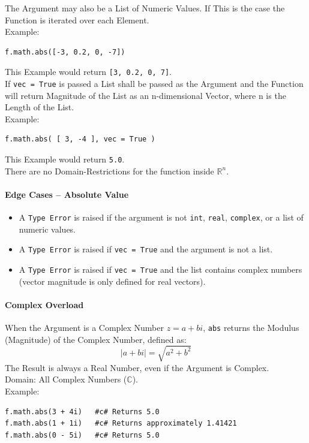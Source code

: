 The Argument may also be a List of Numeric Values. If This is the case the Function is iterated over each Element.\\
Example:
\begin{verbatim}
f.math.abs([-3, 0.2, 0, -7])
\end{verbatim}
This Example would return \texttt{[3, 0.2, 0, 7]}. \vspace{5 mm}\\
If \texttt{vec = True} is passed a List shall be passed as the Argument and the Function will return Magnitude of the List as an n-dimensional Vector, where n is the Length of the List.\\ %
Example:
\begin{verbatim}
f.math.abs( [ 3, -4 ], vec = True )
\end{verbatim}
This Example would return \texttt{5.0}.\\
There are no Domain-Restrictions for the function inside $\mathbb{R}^n$.

\paragraph{Edge Cases -- Absolute Value}
\begin{itemize}
\item A \texttt{Type Error} is raised if the argument is not \texttt{int}, \texttt{real}, \texttt{complex}, or a list of numeric values.
\item A \texttt{Type Error} is raised if \texttt{vec = True} and the argument is not a list.
\item A \texttt{Type Error} is raised if \texttt{vec = True} and the list contains complex numbers (vector magnitude is only defined for real vectors).
\end{itemize}

\paragraph{Complex Overload}
When the Argument is a Complex Number $z = a + bi$, \texttt{abs} returns the Modulus (Magnitude) of the Complex Number, defined as:
\[
\lvert a + bi \rvert = \sqrt{a^2 + b^2}
\]
The Result is always a Real Number, even if the Argument is Complex.\\
Domain: All Complex Numbers ($\mathbb{C}$).\\
Example:
\begin{verbatim}
f.math.abs(3 + 4i)   #c# Returns 5.0
f.math.abs(1 + 1i)   #c# Returns approximately 1.41421
f.math.abs(0 - 5i)   #c# Returns 5.0
\end{verbatim}


